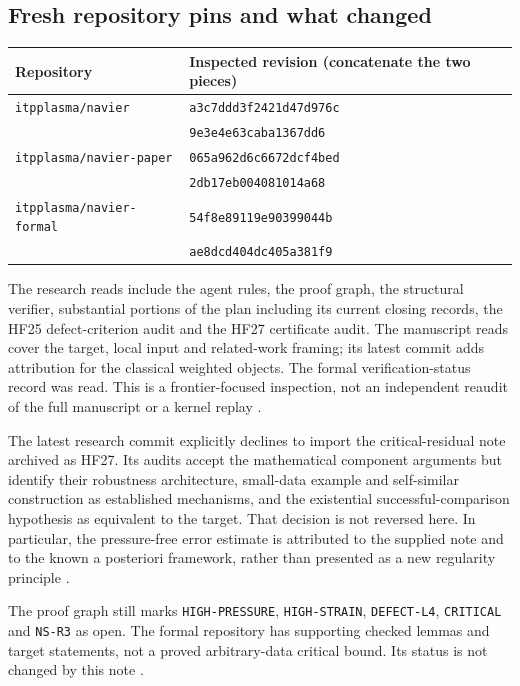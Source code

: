 \documentclass[11pt,a4paper]{article}
\theoremstyle{definition}\newtheorem{definition}[theorem]{Definition}
\theoremstyle{remark}\newtheorem{remark}[theorem]{Remark}
\numberwithin{equation}{section}
\begin{document}
\subsection{Fresh repository pins and what changed}
\begin{center}\small
\begin{tabular}{@{}lp{103mm}@{}}\toprule
Repository & Inspected revision (concatenate the two pieces)\\\midrule
\texttt{itpplasma/navier} & \texttt{a3c7ddd3f2421d47d976c}\\[-2pt]
 & \texttt{9e3e4e63caba1367dd6}\\
\texttt{itpplasma/navier-paper} & \texttt{065a962d6c6672dcf4bed}\\[-2pt]
 & \texttt{2db17eb004081014a68}\\
\texttt{itpplasma/navier-formal} & \texttt{54f8e89119e90399044b}\\[-2pt]
 & \texttt{ae8dcd404dc405a381f9}\\\bottomrule
\end{tabular}
\end{center}
The research reads include the agent rules, the proof graph, the structural verifier, substantial portions of the plan including its current closing records, the HF25 defect-criterion audit and the HF27 certificate audit. The manuscript reads cover the target, local input and related-work framing; its latest commit adds attribution for the classical weighted objects. The formal verification-status record was read. This is a frontier-focused inspection, not an independent reaudit of the full manuscript or a kernel replay \cite{Research,HF25,HF27,Paper,Formal}.

The latest research commit explicitly declines to import the critical-residual note archived as HF27. Its audits accept the mathematical component arguments but identify their robustness architecture, small-data example and self-similar construction as established mechanisms, and the existential successful-comparison hypothesis as equivalent to the target. That decision is not reversed here. In particular, the pressure-free error estimate is attributed to the supplied note and to the known a posteriori framework, rather than presented as a new regularity principle \cite{Decision,HF27}.

The proof graph still marks \texttt{HIGH-PRESSURE}, \texttt{HIGH-STRAIN}, \texttt{DEFECT-L4}, \texttt{CRITICAL} and \texttt{NS-R3} as open. The formal repository has supporting checked lemmas and target statements, not a proved arbitrary-data critical bound. Its status is not changed by this note \cite{Research,Formal}.
\end{document}
